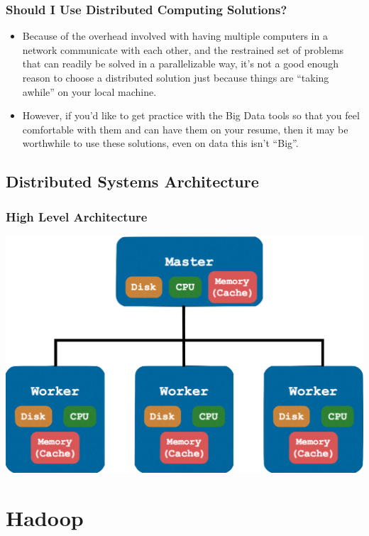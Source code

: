 \documentclass{beamer}
\begin{document}
\begin{frame}
  \frametitle{Should I Use Distributed Computing Solutions?}
  \begin{itemize}
    \item Because of the overhead involved with having multiple computers in a network communicate with each other, and the restrained set of problems that can readily be solved in a parallelizable way, it's not a good enough reason to choose a distributed solution just because things are ``taking awhile'' on your local machine.
    \item However, if you'd like to get practice with the Big Data tools so that you feel comfortable with them and can have them on your resume, then it may be worthwhile to use these solutions, even on data this isn't ``\alert{Big}''.
  \end{itemize}
\end{frame}

\subsection{Distributed Systems Architecture}
\begin{frame}
  \frametitle{High Level Architecture}
  \centering
  \includegraphics[width=\textwidth]{../images/simple_architecture.png}
\end{frame}

\section{Hadoop}
\end{document}
